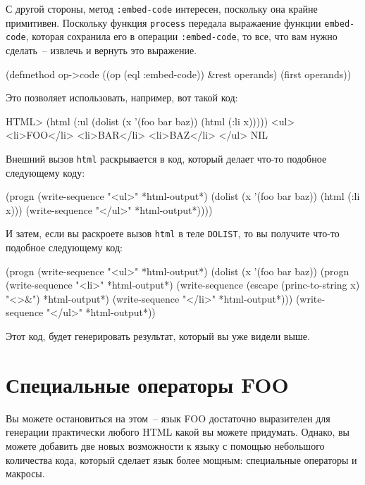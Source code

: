 С другой стороны, метод \lstinline{:embed-code} интересен, поскольку она крайне примитивен.
Поскольку функция \lstinline{process} передала выражаение функции \lstinline{embed-code}, которая
сохранила его в операции \lstinline{:embed-code}, то все, что вам нужно сделать~-- извлечь и
вернуть это выражение.

\begin{myverb}
(defmethod op->code ((op (eql :embed-code)) &rest operands)
  (first operands))
\end{myverb}

Это позволяет использовать, например, вот такой код:

\begin{myverb}
HTML> (html (:ul (dolist (x '(foo bar baz)) (html (:li x)))))
<ul>
  <li>FOO</li>
  <li>BAR</li>
  <li>BAZ</li>
</ul>
NIL
\end{myverb}

Внешний вызов \lstinline{html} раскрывается в код, который делает что-то подобное следующему коду:

\begin{myverb}
(progn
  (write-sequence "<ul>" *html-output*)
  (dolist (x '(foo bar baz)) (html (:li x)))
  (write-sequence "</ul>" *html-output*))))
\end{myverb}

И затем, если вы раскроете вызов \lstinline{html} в теле \lstinline{DOLIST}, то вы получите что-то подобное следующему код:

\begin{myverb}
(progn
  (write-sequence "<ul>" *html-output*)
  (dolist (x '(foo bar baz))
    (progn
      (write-sequence "<li>" *html-output*)
      (write-sequence (escape (princ-to-string x) "<>&") *html-output*)
      (write-sequence "</li>" *html-output*)))
  (write-sequence "</ul>" *html-output*))
\end{myverb}

Этот код, будет генерировать результат, который вы уже видели выше.

\section{Специальные операторы FOO}

Вы можете остановиться на этом~-- язык FOO достаточно выразителен для генерации
практически любого HTML какой вы можете придумать.  Однако, вы можете добавить две новых
возможности к языку с помощью небольшого количества кода, который сделает язык более
мощным: специальные операторы и макросы.

